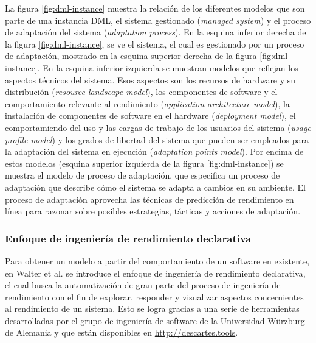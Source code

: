 La figura \ref{fig:dml-instance} muestra la relación de los diferentes modelos que son parte de una instancia DML, el sistema gestionado (\emph{managed system}) y el proceso de adaptación del sistema (\emph{adaptation process}). En la esquina inferior derecha de la figura \ref{fig:dml-instance}, se ve el sistema, el cual es gestionado por un proceso de adaptación, mostrado en la esquina superior derecha de la figura \ref{fig:dml-instance}. En la esquina inferior izquierda se muestran modelos que reflejan los aspectos técnicos del sistema. Esos aspectos son los recursos de hardware y su distribución (\emph{resource landscape model}), los componentes de software y el comportamiento relevante al rendimiento (\emph{application architecture model}), la instalación de componentes de software en el hardware (\emph{deployment model}), el comportamiendo del uso y las cargas de trabajo de los usuarios del sistema (\emph{usage profile model}) y los grados de libertad del sistema que pueden ser empleados para la adaptación del sistema en ejecución (\emph{adaptation points model}). Por encima de estos modelos (esquina superior izquierda de la figura \ref{fig:dml-instance}) se muestra el modelo de proceso de adaptación, que especifica un proceso de adaptación que describe cómo el sistema se adapta a cambios en su ambiente. El proceso de adaptación aprovecha las técnicas de predicción de rendimiento en línea para razonar sobre posibles estrategias, tácticas y acciones de adaptación.

\subsubsection{Enfoque de ingeniería de rendimiento declarativa}

Para obtener un modelo a partir del comportamiento de un software en existente, en Walter et al.\cite{Walter:2018:TDP:3185768.3185777} se introduce el enfoque de ingeniería de rendimiento declarativa, el cual busca la automatización de gran parte del proceso de ingeniería de rendimiento  con el fin de explorar, responder y visualizar aspectos concernientes al rendimiento de un sistema. Esto se logra gracias a una serie de herramientas desarrolladas por el grupo de ingeniería de software de la Universidad Würzburg de Alemania y que están disponibles en \url{http://descartes.tools}.

